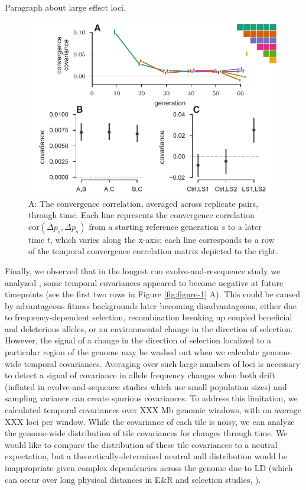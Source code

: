 \documentclass[11pt]{article}
\begin{document}
Paragraph about large effect loci.

\begin{figure}[!ht]
  \centering
  \includegraphics[width=\textwidth]{figures/figure-2.pdf}

  \caption{A: The convergence correlation, averaged across replicate pairs,
    through time. Each line represents the convergence correlation
    $\mathrm{cor}(\Delta p_{s}, \Delta p_{s})$ from a starting reference
    generation $s$ to a later time $t$, which varies along the x-axis; each
  line corresponds to a row of the temporal convergence correlation matrix
depicted to the right.}

  \label{fig:figure-2}
\end{figure}

Finally, we observed that in the longest run evolve-and-resequence study we
analyzed \parencite{Barghi2019-qy}, some temporal covariances appeared to
become negative at future timepoints (see the first two rows in Figure
\ref{fig:figure-1} A). This could be caused by advantageous fitness backgrounds
later becoming disadvantageous, either due to frequency-dependent selection,
recombination breaking up coupled beneficial and deleterious alleles, or an
environmental change in the direction of selection. However, the signal of a
change in the direction of selection localized to a particular region of the
genome may be washed out when we calculate genome-wide temporal covariances.
Averaging over such large numbers of loci is necessary to detect a signal of
covariance in allele frequency changes when both drift (inflated in
evolve-and-sequence studies which use small population sizes) and sampling
variance can create spurious covariances. To address this limitation, we
calculated temporal covariances over XXX Mb genomic windows, with on average
XXX loci per window.  While the covariance of each tile is noisy, we can
analyze the genome-wide distribution of tile covariances for changes through
time. We would like to compare the distribution of these tile covariances to a
neutral expectation, but a theoretically-determined neutral null distribution
would be inappropriate given complex dependencies across the genome due to LD
(which can occur over long physical distances in E&R and selection studies,
\cite{Nuzhdin2013-gf,Baldwin-Brown2014-cl}). 
\end{document}
